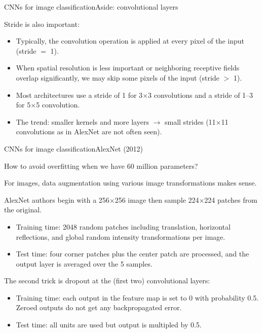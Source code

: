 \documentclass{beamer}
\begin{document}
\begin{frame}{CNNs for image classification}{Aside: convolutional layers}

  \alert{Stride} is also important:
  \begin{itemize}
  \item Typically, the convolution operation is applied at every pixel
    of the input (stride $=$ 1).
  \item When spatial resolution is less important or neighboring
    receptive fields overlap significantly, we may skip some pixels of
    the input (stride $>$ 1).
  \item Most architectures use a stride of 1 for 3$\times$3
    convolutions and a stride of 1--3 for 5$\times$5 convolution.
  \item The trend: smaller kernels and more layers $\rightarrow$ small
    strides (11$\times$11 convolutions as in AlexNet are not often
    seen).
  \end{itemize}
    
\end{frame}


\begin{frame}{CNNs for image classification}{AlexNet (2012)}

  How to avoid overfitting when we have 60 million parameters?

  \medskip

  For images, \alert{data augmentation} using various image
  transformations makes sense.

  \medskip

  AlexNet authors begin with a 256$\times$256 image then sample
  224$\times$224 patches from the original.
  \begin{itemize}
  \item Training time: 2048 random patches including translation,
    horizontal reflections, and global random intensity
    transformations per image.
  \item Test time: four corner patches plus the center patch are
    processed, and the output layer is averaged over the 5 samples.
  \end{itemize}

  \medskip

  The second trick is \alert{dropout} at the (first two) convolutional
  layers:
  \begin{itemize}
  \item Training time: each output in the feature map is set to 0 with
    probability 0.5. Zeroed outputs do not get any backpropagated
    error.
  \item Test time: all units are used but output is multipled by 0.5.
  \end{itemize}
  
\end{frame}
\end{document}

